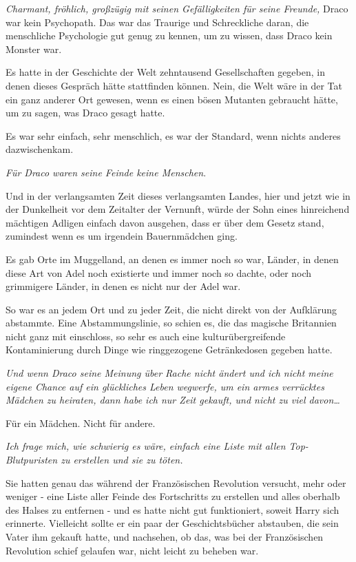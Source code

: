 {\emph{Charmant, fröhlich, großzügig mit seinen Gefälligkeiten für seine Freunde,} Draco war kein Psychopath. Das war das Traurige und Schreckliche daran, die menschliche Psychologie gut genug zu kennen, um zu wissen, dass Draco kein Monster war.

Es hatte in der Geschichte der Welt zehntausend Gesellschaften gegeben, in denen dieses Gespräch hätte stattfinden können. Nein, die Welt wäre in der Tat ein ganz anderer Ort gewesen, wenn es einen bösen Mutanten gebraucht hätte, um zu sagen, was Draco gesagt hatte.

Es war sehr einfach, sehr menschlich, es war der Standard, wenn nichts anderes dazwischenkam.

\emph{Für Draco waren seine Feinde keine Menschen}.

Und in der verlangsamten Zeit dieses verlangsamten Landes, hier und jetzt wie in der Dunkelheit vor dem Zeitalter der Vernunft, würde der Sohn eines hinreichend mächtigen Adligen einfach davon ausgehen, dass er über dem Gesetz stand, zumindest wenn es um irgendein Bauernmädchen ging.

Es gab Orte im Muggelland, an denen es immer noch so war, Länder, in denen diese Art von Adel noch existierte und immer noch so dachte, oder noch grimmigere Länder, in denen es nicht nur der Adel war.

So war es an jedem Ort und zu jeder Zeit, die nicht direkt von der Aufklärung abstammte. Eine Abstammungslinie, so schien es, die das magische Britannien nicht ganz mit einschloss, so sehr es auch eine kulturübergreifende Kontaminierung durch Dinge wie ringgezogene Getränkedosen gegeben hatte.

\emph{Und wenn Draco seine Meinung über Rache nicht ändert und ich nicht meine eigene Chance auf ein glückliches Leben wegwerfe, um ein armes verrücktes Mädchen zu heiraten, dann habe ich nur Zeit gekauft, und nicht zu viel davon…}

Für ein Mädchen. Nicht für andere.

\emph{Ich frage mich, wie schwierig es wäre, einfach eine Liste mit allen Top-Blutpuristen zu erstellen und sie zu töten.}

Sie hatten genau das während der Französischen Revolution versucht, mehr oder weniger - eine Liste aller Feinde des Fortschritts zu erstellen und alles oberhalb des Halses zu entfernen - und es hatte nicht gut funktioniert, soweit Harry sich erinnerte. Vielleicht sollte er ein paar der Geschichtsbücher abstauben, die sein Vater ihm gekauft hatte, und nachsehen, ob das, was bei der Französischen Revolution schief gelaufen war, nicht leicht zu beheben war.

}
